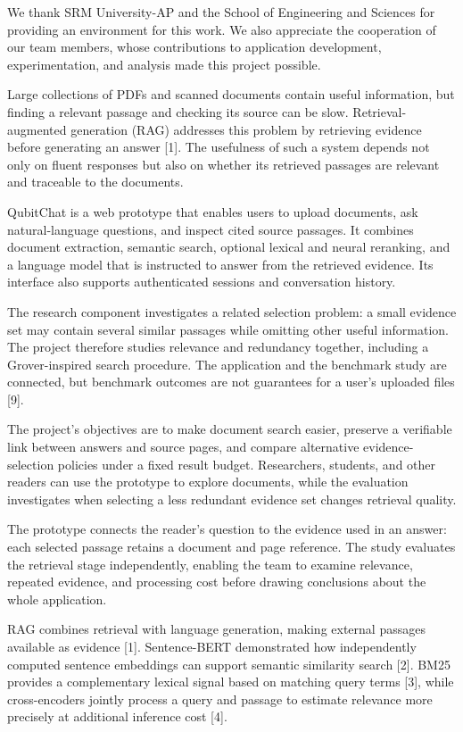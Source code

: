 \documentclass[11pt,a4paper]{article}
\newcommand{\reportheading}[1]{\par\vspace{4pt}{\large\bfseries #1}\par\vspace{1pt}}
\begin{document}
We thank SRM University-AP and the School of Engineering and Sciences for providing an environment for this work. We also appreciate the cooperation of our team members, whose contributions to application development, experimentation, and analysis made this project possible.

\reportheading{1. Introduction}
Large collections of PDFs and scanned documents contain useful information, but finding a relevant passage and checking its source can be slow. Retrieval-augmented generation (RAG) addresses this problem by retrieving evidence before generating an answer [1]. The usefulness of such a system depends not only on fluent responses but also on whether its retrieved passages are relevant and traceable to the documents.

QubitChat is a web prototype that enables users to upload documents, ask natural-language questions, and inspect cited source passages. It combines document extraction, semantic search, optional lexical and neural reranking, and a language model that is instructed to answer from the retrieved evidence. Its interface also supports authenticated sessions and conversation history.

The research component investigates a related selection problem: a small evidence set may contain several similar passages while omitting other useful information. The project therefore studies relevance and redundancy together, including a Grover-inspired search procedure. The application and the benchmark study are connected, but benchmark outcomes are not guarantees for a user's uploaded files [9].

The project's objectives are to make document search easier, preserve a verifiable link between answers and source pages, and compare alternative evidence-selection policies under a fixed result budget. Researchers, students, and other readers can use the prototype to explore documents, while the evaluation investigates when selecting a less redundant evidence set changes retrieval quality.

The prototype connects the reader's question to the evidence used in an answer: each selected passage retains a document and page reference. The study evaluates the retrieval stage independently, enabling the team to examine relevance, repeated evidence, and processing cost before drawing conclusions about the whole application.

\newpage
\begingroup\linespread{1.13}\selectfont
\reportheading{2. Literature Survey}
RAG combines retrieval with language generation, making external passages available as evidence [1]. Sentence-BERT demonstrated how independently computed sentence embeddings can support semantic similarity search [2]. BM25 provides a complementary lexical signal based on matching query terms [3], while cross-encoders jointly process a query and passage to estimate relevance more precisely at additional inference cost [4].
\end{document}
